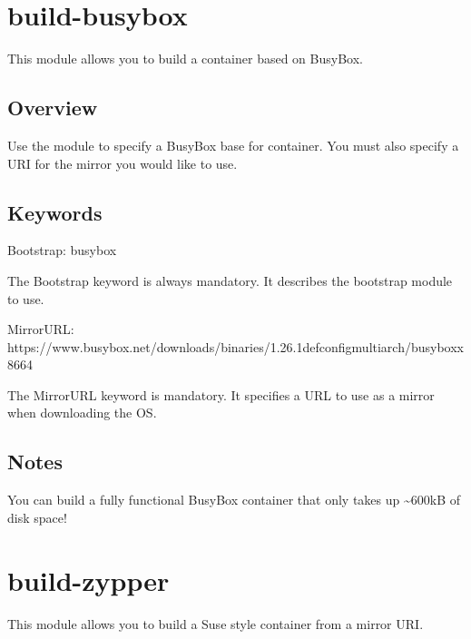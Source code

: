 \documentclass[letterpaper,10pt,english]{sphinxmanual}
\begin{document}
\section{build-busybox}
\label{\detokenize{appendix:build-busybox}}\label{\detokenize{appendix:id22}}\label{\detokenize{appendix:sec-build-busybox}}
This module allows you to build a container based on BusyBox.


\subsection{Overview}
\label{\detokenize{appendix:id23}}
Use the  module to specify a BusyBox base for container. You must also specify a URI for the mirror you would like to use.


\subsection{Keywords}
\label{\detokenize{appendix:id24}}
%
\begin{sphinxVerbatim}[commandchars=\\\{\}]
Bootstrap: busybox
\end{sphinxVerbatim}

The Bootstrap keyword is always mandatory. It describes the bootstrap module to use.

%
\begin{sphinxVerbatim}[commandchars=\\\{\}]
MirrorURL: https://www.busybox.net/downloads/binaries/1.26.1\PYGZhy{}defconfig\PYGZhy{}multiarch/busybox\PYGZhy{}x86\PYGZus{}64
\end{sphinxVerbatim}

The MirrorURL keyword is mandatory. It specifies a URL to use as a mirror when downloading the OS.


\subsection{Notes}
\label{\detokenize{appendix:id25}}
You can build a fully functional BusyBox container that only takes up \textasciitilde{}600kB of disk space!


\section{build-zypper}
\label{\detokenize{appendix:build-zypper}}\label{\detokenize{appendix:id26}}\label{\detokenize{appendix:sec-build-zypper}}
This module allows you to build a Suse style container from a mirror URI.
\end{document}
